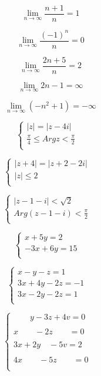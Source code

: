 \documentclass[12pt]{article}
\begin{document}
$$
\lim_{n\to\infty}\frac{n+1}{n} = 1
$$

$$
\lim_{n\to\infty}\frac{(-1)^n}{n} = 0
$$

$$
\lim_{n\to\infty}\frac{2n+5}{n} = 2
$$

$$
\lim_{n\to\infty}2n-1 = \infty
$$

$$
\lim_{n\to\infty}(-n^2 + 1) = -\infty
$$


$$
\left\{ \begin{array}{ll}
|z|=|z-4i| & \textrm{}\\
\frac{\pi}{4} \leq Argz < \frac{\pi}{2} & \textrm{}\\
\end{array} \right.
$$

$$
\left\{ \begin{array}{ll}
|z+4|=|z+2-2i| & \textrm{}\\
|z|\leq 2 & \textrm{}\\
\end{array} \right.
$$

$$
\left\{ \begin{array}{ll}
|z-1-i|< \sqrt{2} & \textrm{}\\
Arg(z-1-i) < \frac{\pi}{2} & \textrm{}\\
\end{array} \right.
$$

$$
\left\{ \begin{array}{ll}
x+5y=2 & \\
-3x + 6y = 15 & \\
\end{array} \right.
$$

$$
\left\{ \begin{array}{ll}
x-y-z = 1 & \\
3x+4y-2z = -1 & \\
3x-2y-2z = 1 & \\
\end{array} \right.
$$

$$
\left\{ \begin{array}{ll}
\qquad y-3z+4v = 0\\ & \\
x\qquad -2z\qquad = 0\\ & \\
3x+2y\quad -5v = 2\\ & \\
4x\qquad -5z \qquad= 0\\ & \\
\end{array} \right.
$$
\end{document}
